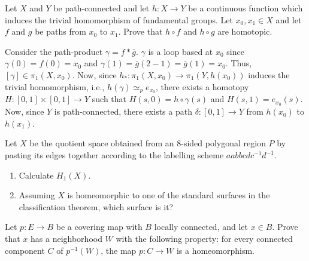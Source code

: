 \begin{problem}
  Let \(X\) and \(Y\) be path-connected and let \(h\colon X\to Y\) be a
  continuous function which induces the trivial homomorphism of fundamental
  groups. Let \(x_0,x_1\in X\) and let \(f\) and \(g\) be paths from
  \(x_0\) to \(x_1\). Prove that \(h\circ f\) and \(h\circ g\) are
  homotopic.
\end{problem}
\begin{solution}
  Consider the path-product \(\gamma= f*\bar g\). \(\gamma\) is a loop
  based at \(x_0\) since \(\gamma(0)=f(0)=x_0\) and
  \(\gamma(1)=\bar g(2-1)=\bar g(1)=x_0\). Thus,
  \([\gamma]\in\pi_1(X,x_0)\). Now, since
  \(h_*\colon\pi_1(X,x_0)\to\pi_1(Y,h(x_0))\) induces the trivial
  homomorphism, i.e., \(h(\gamma)\simeq_p e_{x_0}\), there exists a
  homotopy \(H\colon [0,1]\times[0,1]\to Y\) such that
  \(H(s,0)=h\circ\gamma(s)\) and \(H(s,1)=e_{x_0}(s)\). Now, since \(Y\) is
  path-connected, there exists a path \(\delta\colon[0,1]\to Y\) from
  \(h(x_0)\) to \(h(x_1)\).
\end{solution}
\begin{problem}
  Let \(X\) be the quotient space obtained from an \(8\)-sided polygonal
  region \(P\) by pasting its edges together according to the labelling
  scheme \(aabbcdc^{-1}d^{-1}\).
  \begin{enumerate}[noitemsep,label=(\roman*)]
  \item Calculate \(H_1(X)\).
  \item Assuming \(X\) is homeomorphic to one of the standard surfaces in
    the classification theorem, which surface is it?
  \end{enumerate}
\end{problem}
\begin{solution}
\end{solution}
\begin{problem}
  Let \(p\colon E\to B\) be a covering map with \(B\) locally connected,
  and let \(x\in B\). Prove that \(x\) has a neighborhood \(W\) with the
  following property: for every connected component \(C\) of \(p^{-1}(W)\),
  the map \(p\colon C\to W\) is a homeomorphism.
\end{problem}
\begin{solution}
\end{solution}

